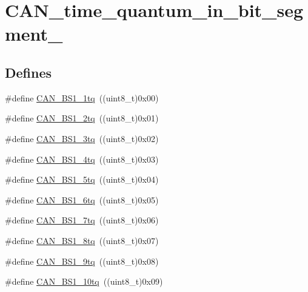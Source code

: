 \hypertarget{group__CAN__time__quantum__in__bit__segment__1}{
\section{CAN\_\-time\_\-quantum\_\-in\_\-bit\_\-segment\_}
\label{group__CAN__time__quantum__in__bit__segment__1}
}
\subsection*{Defines}
\begin{DoxyCompactItemize}
\item 
\#define \hyperlink{group__CAN__time__quantum__in__bit__segment__1_ga76b8fb0815b7a3f398fffe72dda0bc04}{CAN\_\-BS1\_\-1tq}~((uint8\_\-t)0x00)
\item 
\#define \hyperlink{group__CAN__time__quantum__in__bit__segment__1_ga1544ecf902e6173859d60cff9530971a}{CAN\_\-BS1\_\-2tq}~((uint8\_\-t)0x01)
\item 
\#define \hyperlink{group__CAN__time__quantum__in__bit__segment__1_gaa808099663480de935d3ce9187c2dcab}{CAN\_\-BS1\_\-3tq}~((uint8\_\-t)0x02)
\item 
\#define \hyperlink{group__CAN__time__quantum__in__bit__segment__1_ga7c5c668200f41991e14b31ca20235000}{CAN\_\-BS1\_\-4tq}~((uint8\_\-t)0x03)
\item 
\#define \hyperlink{group__CAN__time__quantum__in__bit__segment__1_ga31dea95492dababfcf79bcaeb884b99e}{CAN\_\-BS1\_\-5tq}~((uint8\_\-t)0x04)
\item 
\#define \hyperlink{group__CAN__time__quantum__in__bit__segment__1_gaa7fc6fcdf9c1c70ee9700b35e32e205e}{CAN\_\-BS1\_\-6tq}~((uint8\_\-t)0x05)
\item 
\#define \hyperlink{group__CAN__time__quantum__in__bit__segment__1_gafec90578d657073a671b6326f3bfcf8e}{CAN\_\-BS1\_\-7tq}~((uint8\_\-t)0x06)
\item 
\#define \hyperlink{group__CAN__time__quantum__in__bit__segment__1_ga1049ea9bc5b3da680574ca444e888de4}{CAN\_\-BS1\_\-8tq}~((uint8\_\-t)0x07)
\item 
\#define \hyperlink{group__CAN__time__quantum__in__bit__segment__1_ga0493701bdd73a9649510f035439a6580}{CAN\_\-BS1\_\-9tq}~((uint8\_\-t)0x08)
\item 
\#define \hyperlink{group__CAN__time__quantum__in__bit__segment__1_gaf1b474aa632787e70bedd0c5dfdbf5ed}{CAN\_\-BS1\_\-10tq}~((uint8\_\-t)0x09)
\item 

\end{DoxyCompactItemize}
